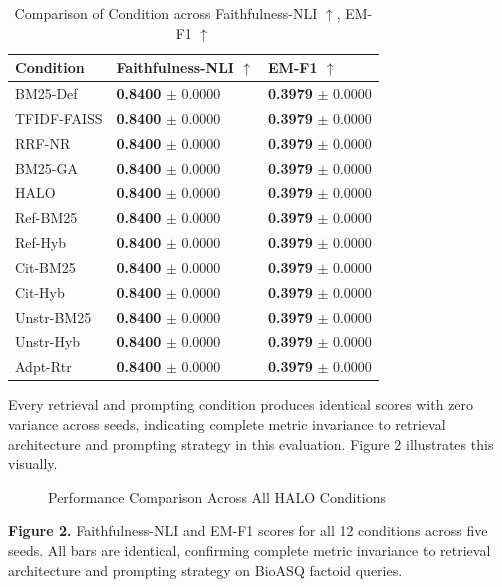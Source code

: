 \documentclass{article}
\begin{document}
\begin{table}[ht]
\centering
\begin{tabular}{lll}
\toprule
\textbf{Condition} & \textbf{Faithfulness-NLI $\uparrow$} & \textbf{EM-F1 $\uparrow$} \\
\midrule
BM25-Def & \textbf{0.8400} $\pm$ 0.0000 & \textbf{0.3979} $\pm$ 0.0000 \\
TFIDF-FAISS & \textbf{0.8400} $\pm$ 0.0000 & \textbf{0.3979} $\pm$ 0.0000 \\
RRF-NR & \textbf{0.8400} $\pm$ 0.0000 & \textbf{0.3979} $\pm$ 0.0000 \\
BM25-GA & \textbf{0.8400} $\pm$ 0.0000 & \textbf{0.3979} $\pm$ 0.0000 \\
HALO & \textbf{0.8400} $\pm$ 0.0000 & \textbf{0.3979} $\pm$ 0.0000 \\
Ref-BM25 & \textbf{0.8400} $\pm$ 0.0000 & \textbf{0.3979} $\pm$ 0.0000 \\
Ref-Hyb & \textbf{0.8400} $\pm$ 0.0000 & \textbf{0.3979} $\pm$ 0.0000 \\
Cit-BM25 & \textbf{0.8400} $\pm$ 0.0000 & \textbf{0.3979} $\pm$ 0.0000 \\
Cit-Hyb & \textbf{0.8400} $\pm$ 0.0000 & \textbf{0.3979} $\pm$ 0.0000 \\
Unstr-BM25 & \textbf{0.8400} $\pm$ 0.0000 & \textbf{0.3979} $\pm$ 0.0000 \\
Unstr-Hyb & \textbf{0.8400} $\pm$ 0.0000 & \textbf{0.3979} $\pm$ 0.0000 \\
Adpt-Rtr & \textbf{0.8400} $\pm$ 0.0000 & \textbf{0.3979} $\pm$ 0.0000 \\
\bottomrule
\end{tabular}
\caption{Comparison of Condition across Faithfulness-NLI $\uparrow$, EM-F1 $\uparrow$}
\label{tab:2}
\end{table}

Every retrieval and prompting condition produces identical scores with zero variance across seeds, indicating complete metric invariance to retrieval architecture and prompting strategy in this evaluation. Figure 2 illustrates this visually.

\begin{figure}[t]
\centering

\caption{Performance Comparison Across All HALO Conditions}
\label{fig:performance_comparison_across_}
\end{figure}

\textbf{Figure 2.} Faithfulness-NLI and EM-F1 scores for all 12 conditions across five seeds. All bars are identical, confirming complete metric invariance to retrieval architecture and prompting strategy on BioASQ factoid queries.
\end{document}
